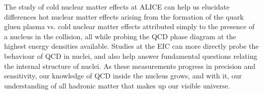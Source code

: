 The study of cold nuclear matter effects at ALICE can help us elucidate differences hot nuclear matter effects arising from the formation of the quark gluen plasma vs. cold nuclear matter effects attributed simply to the presence of a nucleus in the collision, all while probing the QCD phase diagram at the highest energy densities available. Studies at the EIC can more directly probe the behaviour of QCD in nuclei, and also help answer fundamental questions relating the internal structure of nuclei. As these measurements progress in precision and sensitivity, our knowledge of QCD inside the nucleus grows, and with it, our understanding of all hadronic matter that makes up our visible universe.

